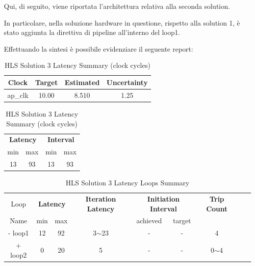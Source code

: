 Qui, di seguito, viene riportata l'architettura relativa alla seconda solution.



In particolare, nella soluzione hardware in questione, rispetto alla solution 1, è stato aggiunta la direttiva di pipeline all'interno del loop1.

Effettuando la sintesi è possibile evidenziare il seguente report:\\

\begin{table}[H]
	\centering
	\begin{minipage}[t]{0.45\linewidth}
		\centering
		\begin{tabular}{|c|c|c|c|}
			\hline
			\textbf{Clock} & \textbf{Target} & \textbf{Estimated} & \textbf{Uncertainty} \\
			\hline
			ap\_clk & 10.00 & 8.510 & 1.25 \\
			\hline
		\end{tabular}
		\caption{HLS Solution 3 Timing Summary (ns)}
		\label{tab:hls-solution-3-timing-summary}
	\end{minipage}
	\hfill
	\begin{minipage}[t]{0.45\linewidth}
		\centering
		\begin{tabular}{|c|c|c|c|}
			\hline
			\multicolumn{2}{|c|}{\textbf{Latency}} & \multicolumn{2}{|c|}{\textbf{Interval}} \\
			min & max & min & max \\
			\hline
			13 & 93 & 13 & 93 \\
			\hline
		\end{tabular}
		\caption{HLS Solution 3 Latency Summary (clock cycles)}
		\label{tab:hls-solution-3-latency-summary}
	\end{minipage}
\end{table}

\begin{table}[H]
	\centering
	\begin{tabular}{|c|c|c|c|c|c|c|c|c|}
		\hline
		\multicolumn{1}{|c|}{Loop} & \multicolumn{2}{|c|}{\textbf{Latency}} & \multicolumn{1}{c|}{\textbf{Iteration Latency}} & \multicolumn{2}{c|}{\textbf{Initiation Interval}} & \multicolumn{1}{c|}{\textbf{Trip Count}}  \\
		Name & min & max &  & achieved & target &  \\
		\hline
		- loop1 & 12 & 92 & 3$\sim$23 & - & - & 4 \\
		+ loop2 & 0 & 20 & 5 & - & - & 0$\sim$4 \\
		\hline
	\end{tabular}
	\caption{HLS Solution 3 Latency Loops Summary}
	\label{tab:hls-solution-3-loop-summary}
\end{table}


